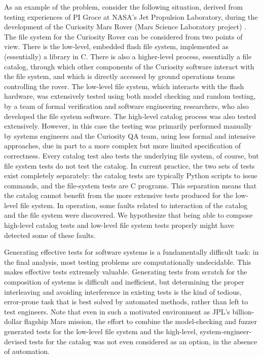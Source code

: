 {As an example of the problem, consider the following situation,
derived from testing experiences of PI Groce at NASA's Jet Propulsion
Laboratory, during the development of the Curiosity Mars Rover (Mars
Science Laboratory project) \cite{CFV08,ICSEDiff,AMAI}.  The file
system for the Curiosity Rover can be considered from two points of
view.  There is the low-level, embedded flash file system, implemented
as (essentially) a library in C.  There is also a higher-level
process, essentially a file catalog, through which other components of
the Curiosity software interact with the file system, and which is
directly accessed by ground operations teams controlling the rover.
The low-level file system, which interacts with the flash hardware,
was extensively tested using both model checking and random testing,
by a team of formal verification and software engineering researchers,
who also developed the file system software.  The high-level catalog
process was also tested extensively.  However, in this case the
testing was primarily performed manually by systems engineers and the Curiosity
QA team, using less formal and intensive approaches, due in part to a
more complex but more limited specification of correctness.  Every
catalog test also tests the underlying file system, of course, but file system
tests do not test the catalog.  In current practice, the two sets of
tests exist completely separately: the catalog tests are typically
Python scripts to issue commands, and the file-system tests are C
programs.  This separation means that the catalog cannot benefit from
the more extensive tests produced for the low-level file system.  In
operation, some faults related to interaction of the catalog and the
file system were discovered.  We hypothesize that being able to
compose high-level catalog tests and low-level file system tests
properly might have detected some of these faults.

Generating effective tests for software systems is a
fundamentally difficult task: in the final analysis, most testing
problems are computationally undecidable.  This makes effective tests
extremely valuable.  Generating tests from scratch for the composition
of systems is difficult and inefficient, but determining the proper
interleaving and avoiding interference in existing tests is the kind
of tedious, error-prone task that is best solved by automated methods,
rather than left to test engineers.  Note that even in such a
motivated environment as JPL's
billion-dollar flagship Mars mission, the effort to combine the
model-checking and fuzzer generated tests for the low-level file
system and the high-level, system-engineer-devised tests for the
catalog was not even considered as an option, in the absence of
automation.}

